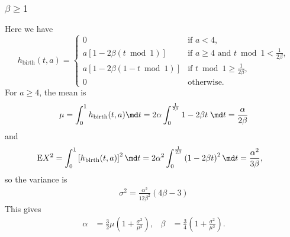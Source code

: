 \documentclass{jpmarticle}
\begin{document}
\subsubsection{$\beta \geq 1$}

Here we have
\begin{equation}
  h_{\mathrm{birth}}(t, a) =
  \begin{cases}
    0 & \text{if $a < 4$},
    \\
    a \left[1 - 2 \beta (t \bmod 1)\right]
    & \text{if $a \geq 4$ and $t \bmod 1 < \frac{1}{2 \beta}$},
    \\
    a \left[1 - 2 \beta (1 - t \bmod 1)\right]
    & \text{if $t \bmod 1 \geq \frac{1}{2 \beta}$},
    \\
    0 & \text{otherwise}.
  \end{cases}
\end{equation}
For $a \geq 4$, the mean is
\begin{align}
  \mu = \int_0^1 h_{\mathrm{birth}}(t, a) \md t
  = 2 \alpha \int_0^{\frac{1}{2 \beta}} 1 - 2 \beta t \; \md t
  = \frac{\alpha}{2 \beta}
\end{align}
and
\begin{align}
  \mathrm{E} X^2 &= \int_0^1 \left[h_{\mathrm{birth}}(t, a)\right]^2 \md t
  = 2 \alpha^2 \int_0^{\frac{1}{2 \beta}} \left(1 - 2 \beta t\right)^2 \md t
  = \frac{\alpha^2}{3 \beta},
\end{align}
so the variance is
\begin{align}
  \sigma^2 = \frac{\alpha^2}{12 \beta^2} (4 \beta - 3)
\end{align}
This gives
\begin{align}
  \alpha &= \frac{3}{2} \mu \left(1 + \frac{\sigma^2}{\mu^2}\right),
  &
  \beta &= \frac{3}{4} \left(1 + \frac{\sigma^2}{\mu^2}\right).
\end{align}
\end{document}
